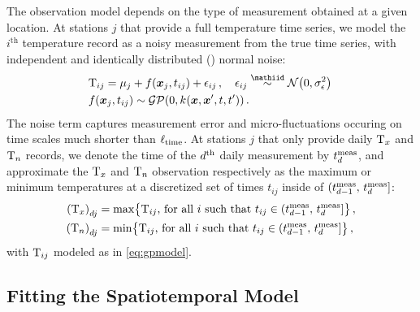 \documentclass[12pt]{article}
\begin{document}
The observation model depends on the type of measurement obtained at a given location.
At stations \(j\) that provide a full temperature time series, we model the \(i^{\mathrm{th}}\) temperature record as a noisy measurement from the true time series, with independent and identically distributed (\iid{}) normal noise:
\begin{equation}
\begin{split}
    & \T_{ij} = \mu_{j} + f(\xvec_j, t_{ij}) + \epsilon_{ij}\,,\quad
    \epsilon_{ij} \overset{\mathiid}{\sim} \normal\del{0,\sigman^2}\,\\
    & f(\xvec_j, t_{ij}) \sim \GP\del{0, k_{}(\xvec,\xvec',t,t')}\,.\\
\end{split}
\label{eq:gpmodel}
\end{equation}
The noise term captures measurement error and micro-fluctuations occuring on time scales much shorter than \(\ell_{\mathrm{time}}\).
At stations \(j\) that only provide daily \(\mathrm{T}_{x}\) and \(\mathrm{T}_{n}\) records, 
we denote the time of the \(d^{\mathrm{th}}\) daily measurement by \(t^{\mathrm{meas}}_{d}\), 
and approximate the \(\mathrm{T}_{x}\) and \(\mathrm{T}_{n}\) observation respectively as the maximum or minimum temperatures at a discretized set of times \(t_{ij}\) inside of \((t^{\mathrm{meas}}_{d-1},\,t^{\mathrm{meas}}_{d}]\):
\begin{equation}
\begin{split}
    \del{\Tx}_{\iday j} &= \max\cbr{\T_{ij}\text{, for all \(i\) such that } t_{ij} \in \dayset{\iday}} \,,\\
    \del{\Tn}_{\iday j} &= \min\cbr{\T_{ij}\text{, for all \(i\) such that } t_{ij} \in \dayset{\iday}} \,,
\end{split}
\label{eq:obs_Tn_Tx}
\end{equation}
with \(\mathrm{T}_{ij}\) modeled as in \autoref{eq:gpmodel}.

\subsection{Fitting the Spatiotemporal Model}\label{fitting-the-spatiotemporal-model}
\end{document}
